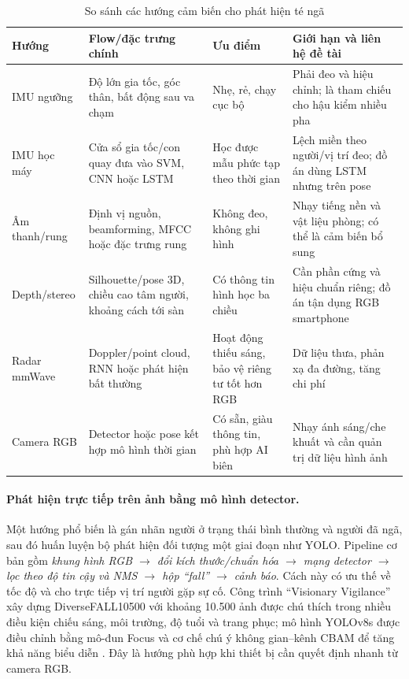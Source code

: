 \begin{table}[htbp]
\centering
\caption{So sánh các hướng cảm biến cho phát hiện té ngã}
\label{tab:fall_sensing_comparison}
\small
\begin{tabularx}{\textwidth}{|p{2.3cm}|X|X|X|}
\hline
\textbf{Hướng} & \textbf{Flow/đặc trưng chính} & \textbf{Ưu điểm} & \textbf{Giới hạn và liên hệ đề tài} \\
\hline
IMU ngưỡng & Độ lớn gia tốc, góc thân, bất động sau va chạm & Nhẹ, rẻ, chạy cục bộ & Phải đeo và hiệu chỉnh; là tham chiếu cho hậu kiểm nhiều pha \\
\hline
IMU học máy & Cửa sổ gia tốc/con quay đưa vào SVM, CNN hoặc LSTM & Học được mẫu phức tạp theo thời gian & Lệch miền theo người/vị trí đeo; đồ án dùng LSTM nhưng trên pose \\
\hline
Âm thanh/rung & Định vị nguồn, beamforming, MFCC hoặc đặc trưng rung & Không đeo, không ghi hình & Nhạy tiếng nền và vật liệu phòng; có thể là cảm biến bổ sung \\
\hline
Depth/stereo & Silhouette/pose 3D, chiều cao tâm người, khoảng cách tới sàn & Có thông tin hình học ba chiều & Cần phần cứng và hiệu chuẩn riêng; đồ án tận dụng RGB smartphone \\
\hline
Radar mmWave & Doppler/point cloud, RNN hoặc phát hiện bất thường & Hoạt động thiếu sáng, bảo vệ riêng tư tốt hơn RGB & Dữ liệu thưa, phản xạ đa đường, tăng chi phí \\
\hline
Camera RGB & Detector hoặc pose kết hợp mô hình thời gian & Có sẵn, giàu thông tin, phù hợp AI biên & Nhạy ánh sáng/che khuất và cần quản trị dữ liệu hình ảnh \\
\hline
\end{tabularx}
\end{table}

\paragraph{Phát hiện trực tiếp trên ảnh bằng mô hình detector.}
Một hướng phổ biến là gán nhãn người ở trạng thái bình thường và người đã ngã, sau đó huấn luyện bộ phát hiện đối tượng một giai đoạn như YOLO. Pipeline cơ bản gồm \textit{khung hình RGB $\rightarrow$ đổi kích thước/chuẩn hóa $\rightarrow$ mạng detector $\rightarrow$ lọc theo độ tin cậy và NMS $\rightarrow$ hộp ``fall'' $\rightarrow$ cảnh báo}. Cách này có ưu thế về tốc độ và cho trực tiếp vị trí người gặp sự cố. Công trình ``Visionary Vigilance'' xây dựng DiverseFALL10500 với khoảng 10.500 ảnh được chú thích trong nhiều điều kiện chiếu sáng, môi trường, độ tuổi và trang phục; mô hình YOLOv8s được điều chỉnh bằng mô-đun Focus và cơ chế chú ý không gian--kênh CBAM để tăng khả năng biểu diễn . Đây là hướng phù hợp khi thiết bị cần quyết định nhanh từ camera RGB.

